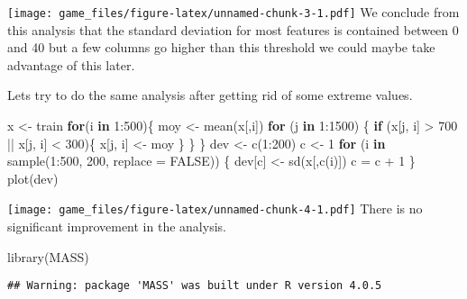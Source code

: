 \documentclass[
]{article}
\newenvironment{Shaded}{\begin{snugshade}}{\end{snugshade}}
\newcommand{\AttributeTok}[1]{\textcolor[rgb]{0.77,0.63,0.00}{#1}}
\newcommand{\ConstantTok}[1]{\textcolor[rgb]{0.00,0.00,0.00}{#1}}
\newcommand{\ControlFlowTok}[1]{\textcolor[rgb]{0.13,0.29,0.53}{\textbf{#1}}}
\newcommand{\DecValTok}[1]{\textcolor[rgb]{0.00,0.00,0.81}{#1}}
\newcommand{\FunctionTok}[1]{\textcolor[rgb]{0.00,0.00,0.00}{#1}}
\newcommand{\NormalTok}[1]{#1}
\newcommand{\OtherTok}[1]{\textcolor[rgb]{0.56,0.35,0.01}{#1}}
\newcommand{\SpecialCharTok}[1]{\textcolor[rgb]{0.00,0.00,0.00}{#1}}
\begin{document}
\texttt{[image: game\_files/figure-latex/unnamed-chunk-3-1.pdf]} We
conclude from this analysis that the standard deviation for most
features is contained between 0 and 40 but a few columns go higher than
this threshold we could maybe take advantage of this later.

Lets try to do the same analysis after getting rid of some extreme
values.

\begin{Shaded}
\begin{Highlighting}[]
\NormalTok{x }\OtherTok{\textless{}{-}}\NormalTok{ train}
\ControlFlowTok{for}\NormalTok{(i }\ControlFlowTok{in} \DecValTok{1}\SpecialCharTok{:}\DecValTok{500}\NormalTok{)\{}
\NormalTok{  moy }\OtherTok{\textless{}{-}} \FunctionTok{mean}\NormalTok{(x[,i])}
  \ControlFlowTok{for}\NormalTok{ (j }\ControlFlowTok{in} \DecValTok{1}\SpecialCharTok{:}\DecValTok{1500}\NormalTok{) \{}
    \ControlFlowTok{if}\NormalTok{ (x[j, i] }\SpecialCharTok{\textgreater{}} \DecValTok{700} \SpecialCharTok{||}\NormalTok{ x[j, i] }\SpecialCharTok{\textless{}} \DecValTok{300}\NormalTok{)\{}
\NormalTok{      x[j, i] }\OtherTok{\textless{}{-}}\NormalTok{ moy}
\NormalTok{    \}}
\NormalTok{  \}}
\NormalTok{\}}
\NormalTok{dev }\OtherTok{\textless{}{-}} \FunctionTok{c}\NormalTok{(}\DecValTok{1}\SpecialCharTok{:}\DecValTok{200}\NormalTok{)}
\NormalTok{c }\OtherTok{\textless{}{-}} \DecValTok{1}
\ControlFlowTok{for}\NormalTok{ (i }\ControlFlowTok{in} \FunctionTok{sample}\NormalTok{(}\DecValTok{1}\SpecialCharTok{:}\DecValTok{500}\NormalTok{, }\DecValTok{200}\NormalTok{, }\AttributeTok{replace =} \ConstantTok{FALSE}\NormalTok{)) \{}
\NormalTok{  dev[c] }\OtherTok{\textless{}{-}} \FunctionTok{sd}\NormalTok{(x[,}\FunctionTok{c}\NormalTok{(i)])}
\NormalTok{  c }\OtherTok{=}\NormalTok{ c }\SpecialCharTok{+} \DecValTok{1}
\NormalTok{\}}
\FunctionTok{plot}\NormalTok{(dev)}
\end{Highlighting}
\end{Shaded}

\texttt{[image: game\_files/figure-latex/unnamed-chunk-4-1.pdf]} There is
no significant improvement in the analysis.

\begin{Shaded}
\begin{Highlighting}[]
\FunctionTok{library}\NormalTok{(MASS)}
\end{Highlighting}
\end{Shaded}

\begin{verbatim}
## Warning: package 'MASS' was built under R version 4.0.5
\end{verbatim}
\end{document}
